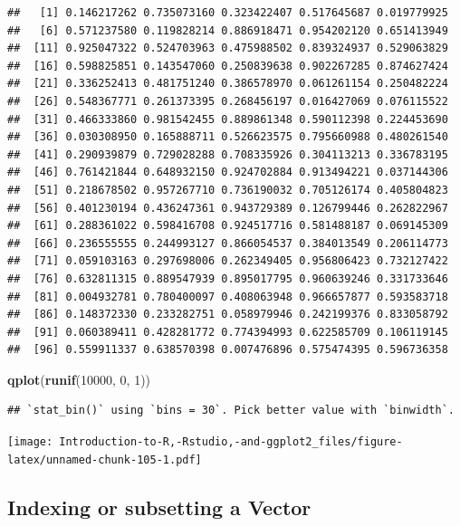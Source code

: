 \documentclass[]{book}
\newenvironment{Shaded}{\begin{snugshade}}{\end{snugshade}}
\newcommand{\DecValTok}[1]{\textcolor[rgb]{0.00,0.00,0.81}{#1}}
\newcommand{\KeywordTok}[1]{\textcolor[rgb]{0.13,0.29,0.53}{\textbf{#1}}}
\newcommand{\NormalTok}[1]{#1}
\begin{document}
\begin{verbatim}
##   [1] 0.146217262 0.735073160 0.323422407 0.517645687 0.019779925
##   [6] 0.571237580 0.119828214 0.886918471 0.954202120 0.651413949
##  [11] 0.925047322 0.524703963 0.475988502 0.839324937 0.529063829
##  [16] 0.598825851 0.143547060 0.250839638 0.902267285 0.874627424
##  [21] 0.336252413 0.481751240 0.386578970 0.061261154 0.250482224
##  [26] 0.548367771 0.261373395 0.268456197 0.016427069 0.076115522
##  [31] 0.466333860 0.981542455 0.889861348 0.590112398 0.224453690
##  [36] 0.030308950 0.165888711 0.526623575 0.795660988 0.480261540
##  [41] 0.290939879 0.729028288 0.708335926 0.304113213 0.336783195
##  [46] 0.761421844 0.648932150 0.924702884 0.913494221 0.037144306
##  [51] 0.218678502 0.957267710 0.736190032 0.705126174 0.405804823
##  [56] 0.401230194 0.436247361 0.943729389 0.126799446 0.262822967
##  [61] 0.288361022 0.598416708 0.924517716 0.581488187 0.069145309
##  [66] 0.236555555 0.244993127 0.866054537 0.384013549 0.206114773
##  [71] 0.059103163 0.297698006 0.262349405 0.956806423 0.732127422
##  [76] 0.632811315 0.889547939 0.895017795 0.960639246 0.331733646
##  [81] 0.004932781 0.780400097 0.408063948 0.966657877 0.593583718
##  [86] 0.148372330 0.233282751 0.058979946 0.242199376 0.833058792
##  [91] 0.060389411 0.428281772 0.774394993 0.622585709 0.106119145
##  [96] 0.559911337 0.638570398 0.007476896 0.575474395 0.596736358
\end{verbatim}

\begin{Shaded}
\begin{Highlighting}[]
\KeywordTok{qplot}\NormalTok{(}\KeywordTok{runif}\NormalTok{(}\DecValTok{10000}\NormalTok{, }\DecValTok{0}\NormalTok{, }\DecValTok{1}\NormalTok{))}
\end{Highlighting}
\end{Shaded}

\begin{verbatim}
## `stat_bin()` using `bins = 30`. Pick better value with `binwidth`.
\end{verbatim}

\texttt{[image: Introduction-to-R,-Rstudio,-and-ggplot2\_files/figure-latex/unnamed-chunk-105-1.pdf]}

\hypertarget{indexing-or-subsetting-a-vector}{%
\subsection{Indexing or subsetting a Vector}\label{indexing-or-subsetting-a-vector}}
\end{document}
